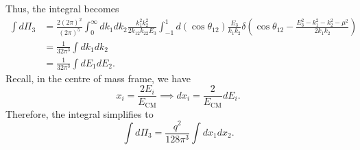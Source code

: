 \documentclass[11pt]{article}
\theoremstyle{definition}
\begin{document}
Thus, the integral becomes
\begin{equation}
    \begin{aligned}
        \int d\Pi_3&=\frac{2(2\pi)^2}{(2\pi)^5} \int^\infty_0dk_1dk_2\frac{k_1^2k_2^2}{2k_12k_22E_3}\int^1_{-1}d(\cos\theta_{12})\frac{E_3}{k_1k_2} \delta\left( \cos\theta_{12} - \frac{E_3^2-k_1^2-k_2^2-\mu^2}{2k_1k_2} \right)\\
        &= \frac{1}{32\pi^3}\int dk_1dk_2\\
        &= \frac{1}{32\pi^3}\int dE_1dE_2.
    \end{aligned}
\end{equation}
Recall, in the centre of mass frame, we have 
\begin{equation}
    x_i = \frac{2E_i}{E_\text{CM}} \implies dx_i = \frac{2}{E_\text{CM}}dE_i.
\end{equation}
Therefore, the integral simplifies to 
\begin{equation}
    \int d\Pi_3 = \frac{q^2}{128\pi^3}\int dx_1dx_2.
\end{equation}
\end{document}
